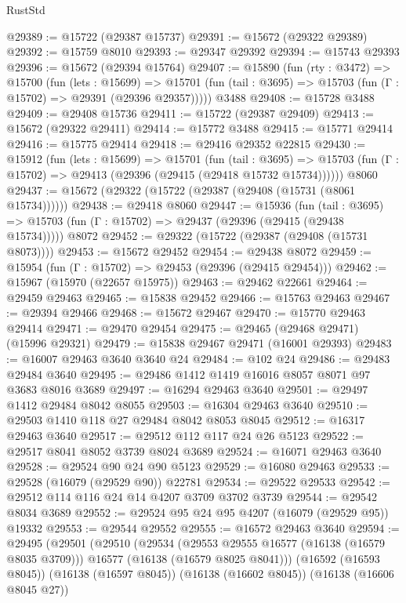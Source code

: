 \begin{lexlean}{RustStd}
\begin{coremodule}
@29389 := @15722 (@29387 @15737)
@29391 := @15672 (@29322 @29389)
@29392 := @15759 @8010
@29393 := @29347 @29392
@29394 := @15743 @29393
@29396 := @15672 (@29394 @15764)
@29407 := @15890
    (fun (rty : @3472) =>
    @15700
      (fun (lets : @15699) =>
      @15701 (fun (tail : @3695) => @15703 (fun (Γ : @15702) => @29391 (@29396 @29357)))))
    @3488
@29408 := @15728 @3488
@29409 := @29408 @15736
@29411 := @15722 (@29387 @29409)
@29413 := @15672 (@29322 @29411)
@29414 := @15772 @3488
@29415 := @15771 @29414
@29416 := @15775 @29414
@29418 := @29416 @29352 @22815
@29430 := @15912
    (fun (lets : @15699) =>
    @15701
      (fun (tail : @3695) =>
      @15703 (fun (Γ : @15702) => @29413 (@29396 (@29415 (@29418 @15732 @15734))))))
    @8060
@29437 := @15672 (@29322 (@15722 (@29387 (@29408 (@15731 (@8061 @15734))))))
@29438 := @29418 @8060
@29447 := @15936
    (fun (tail : @3695) => @15703 (fun (Γ : @15702) => @29437 (@29396 (@29415 (@29438 @15734)))))
    @8072
@29452 := @29322 (@15722 (@29387 (@29408 (@15731 @8073))))
@29453 := @15672 @29452
@29454 := @29438 @8072
@29459 := @15954 (fun (Γ : @15702) => @29453 (@29396 (@29415 @29454)))
@29462 := @15967 (@15970 (@22657 @15975))
@29463 := @29462 @22661
@29464 := @29459 @29463
@29465 := @15838 @29452
@29466 := @15763 @29463
@29467 := @29394 @29466
@29468 := @15672 @29467
@29470 := @15770 @29463 @29414
@29471 := @29470 @29454
@29475 := @29465 (@29468 @29471) (@15996 @29321)
@29479 := @15838 @29467 @29471 (@16001 @29393)
@29483 := @16007 @29463 @3640 @3640 @24
@29484 := @102 @24
@29486 := @29483 @29484 @3640
@29495 := @29486 @1412 @1419 @16016 @8057 @8071 @97 @3683 @8016 @3689
@29497 := @16294 @29463 @3640
@29501 := @29497 @1412 @29484 @8042 @8055
@29503 := @16304 @29463 @3640
@29510 := @29503 @1410 @118 @27 @29484 @8042 @8053 @8045
@29512 := @16317 @29463 @3640
@29517 := @29512 @112 @117 @24 @26 @5123
@29522 := @29517 @8041 @8052 @3739 @8024 @3689
@29524 := @16071 @29463 @3640
@29528 := @29524 @90 @24 @90 @5123
@29529 := @16080 @29463
@29533 := @29528 (@16079 (@29529 @90)) @22781
@29534 := @29522 @29533
@29542 := @29512 @114 @116 @24 @14 @4207 @3709 @3702 @3739
@29544 := @29542 @8034 @3689
@29552 := @29524 @95 @24 @95 @4207 (@16079 (@29529 @95)) @19332
@29553 := @29544 @29552
@29555 := @16572 @29463 @3640
@29594 := @29495
    (@29501
      (@29510
        (@29534
          (@29553 @29555 @16577 (@16138 (@16579 @8035 @3709)))
          @16577
          (@16138 (@16579 @8025 @8041)))
        (@16592 (@16593 @8045))
        (@16138 (@16597 @8045))
        (@16138 (@16602 @8045))
        (@16138 (@16606 @8045 @27))

\end{coremodule}
\end{lexlean}
